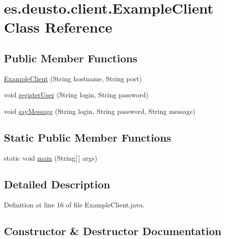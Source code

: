 \hypertarget{classes_1_1deusto_1_1client_1_1_example_client}{}\section{es.\+deusto.\+client.\+Example\+Client Class Reference}
\label{classes_1_1deusto_1_1client_1_1_example_client}
\subsection*{Public Member Functions}
\begin{DoxyCompactItemize}
\item 
\mbox{\hyperlink{classes_1_1deusto_1_1client_1_1_example_client_afe4bf9d0ff661de1e0ba936df0ce807f}{Example\+Client}} (String hostname, String port)
\item 
void \mbox{\hyperlink{classes_1_1deusto_1_1client_1_1_example_client_afcc2d4b74c1768d39359f6e4a7a96f17}{register\+User}} (String login, String password)
\item 
void \mbox{\hyperlink{classes_1_1deusto_1_1client_1_1_example_client_a5bd90c0a118b8f1103cec4316aef33ef}{say\+Message}} (String login, String password, String message)
\end{DoxyCompactItemize}
\subsection*{Static Public Member Functions}
\begin{DoxyCompactItemize}
\item 
static void \mbox{\hyperlink{classes_1_1deusto_1_1client_1_1_example_client_a9eadbc017db92b83cad1f6b72c10bae2}{main}} (String\mbox{[}$\,$\mbox{]} args)
\end{DoxyCompactItemize}


\subsection{Detailed Description}


Definition at line 16 of file Example\+Client.\+java.



\subsection{Constructor \& Destructor Documentation}
\mbox{\label{classes_1_1deusto_1_1client_1_1_example_client_afe4bf9d0ff661de1e0ba936df0ce807f}} 
